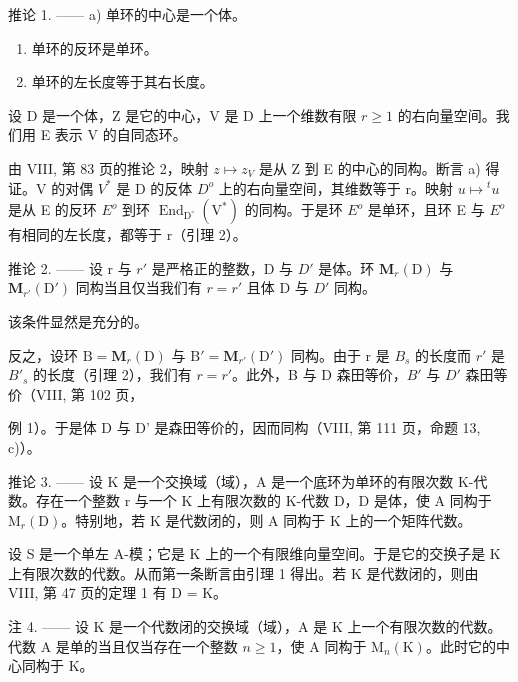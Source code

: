 推论 1. —— a) 单环的中心是一个体。

\begin{enumerate}
\def\labelenumi{\alph{enumi})}
\setcounter{enumi}{1}
\item
  单环的反环是单环。
\item
  单环的左长度等于其右长度。
\end{enumerate}

设 D 是一个体，Z 是它的中心，V 是 D 上一个维数有限 \(r \geqslant 1\) 的右向量空间。我们用 E 表示 V 的自同态环。

由 VIII, 第 83 页的推论 2，映射 \(z \mapsto z_{V}\) 是从 Z 到 E 的中心的同构。断言 a) 得证。V 的对偶 \(V^{*}\) 是 D 的反体 \(D^{o}\) 上的右向量空间，其维数等于 r。映射 \(u \mapsto {}^{t}u\) 是从 E 的反环 \(E^{o}\) 到环 \(\operatorname{End}_{\mathrm{D}^{\circ}}(\mathrm{V}^{*})\) 的同构。于是环 \(E^{o}\) 是单环，且环 E 与 \(E^{o}\) 有相同的左长度，都等于 r（引理 2）。

推论 2. —— 设 r 与 \(r'\) 是严格正的整数，D 与 \(D'\) 是体。环 \(\mathbf{M}_{r}(\mathrm{D})\) 与 \(\mathbf{M}_{r'}(\mathrm{D}')\) 同构当且仅当我们有 \(r = r'\) 且体 D 与 \(D'\) 同构。

该条件显然是充分的。

反之，设环 \(\mathrm{B} = \mathbf{M}_{r}(\mathrm{D})\) 与 \(\mathrm{B}' = \mathbf{M}_{r'}(\mathrm{D}')\) 同构。由于 r 是 \(B_{s}\) 的长度而 \(r'\) 是 \(B'_{s}\) 的长度（引理 2），我们有 \(r = r'\)。此外，B 与 D 森田等价，\(B'\) 与 \(D'\) 森田等价（VIII, 第 102 页，

例 1）。于是体 D 与 D' 是森田等价的，因而同构（VIII, 第 111 页，命题 13, c)）。

推论 3. —— 设 K 是一个交换域（域），A 是一个底环为单环的有限次数 K-代数。存在一个整数 r 与一个 K 上有限次数的 K-代数 D，D 是体，使 A 同构于 \(\mathrm{M}_{r}(\mathrm{D})\)。特别地，若 K 是代数闭的，则 A 同构于 K 上的一个矩阵代数。

设 S 是一个单左 A-模；它是 K 上的一个有限维向量空间。于是它的交换子是 K 上有限次数的代数。从而第一条断言由引理 1 得出。若 K 是代数闭的，则由 VIII, 第 47 页的定理 1 有 D = K。

注 4. —— 设 K 是一个代数闭的交换域（域），A 是 K 上一个有限次数的代数。代数 A 是单的当且仅当存在一个整数 \(n \geqslant 1\)，使 A 同构于 \(\mathrm{M}_{n}(\mathrm{K})\)。此时它的中心同构于 K。

